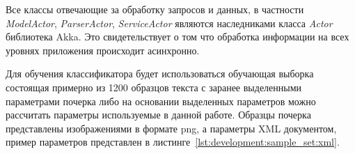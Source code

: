 Все классы отвечающие за обработку запросов и данных, в частности \emph{ModelActor}, \emph{ParserActor}, \emph{ServiceActor} являются наследниками класса \emph{Actor} библиотека Akka. Это свидетельствует о том что обработка информации на всех уровнях приложения происходит асинхронно.

Для обучения классификатора будет использоваться обучающая выборка %
состоящая примерно из 1200 образцов текста с заранее выделенными параметрами почерка либо на основании выделенных параметров можно рассчитать параметры используемые в данной работе. Образцы почерка представлены изображениями в формате png, а параметры XML документом, пример параметров представлен в листинге~\ref{lst:development:sample_set:xml}. 
